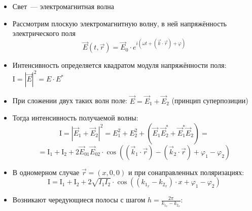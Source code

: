 \documentclass[a4paper, 12pt]{extarticle}
\newcommand{\vect}[1]{\vec{#1}} %
\newcommand{\conj}[1]{#1^*} %
\renewcommand{\phi}{\varphi} %
\newcommand{\I}{\mathrm{I}} %
\begin{document}
  \begin{itemize}
    \item Свет~--- электромагнитная волна
    \item Рассмотрим плоскую электромагнитную волну, в ней напряжённость электрического поля
      \[
        \vect{E}(t, \vect{r}) = \vect{E}_0 \cdot e^{i(\omega t + (\vect{k}\cdot\vect{r}) + \phi)}
      \]
    \item Интенсивность определяется квадратом модуля напряжённости поля: $\I = |\vect{E}|^2 = E\cdot\conj{E}$
    \item При сложении двух таких волн поле: $\vect{E} = \vect{E}_1 + \vect{E}_2$ (принцип суперпозиции)
    \item Тогда интенсивность получаемой волны:
      \[
        \I = |\vect{E}_1 + \vect{E}_2|^2 = E_1^2 + E_2^2 + (\vect{E}_1\conj{\vect{E}_2} + \conj{\vect{E}_1}\vect{E}_2) =
      \]\[
        = \I_1 + \I_2 + 2 \vect{E}_{01} \vect{E}_{02} \cdot \cos \left( (\vect{k}_1\cdot\vect{r}) -
          (\vect{k}_2\cdot\vect{r}) + \phi_1 - \phi_2 \right)
      \]
    \item В одномерном случае $\vect{r} = (x, 0, 0)$ и при сонаправленных поляризациях:
      \[
        \I = \I_1 + \I_2 + 2 \sqrt{I_1 I_2} \cdot \cos \left(
          (k_{1_x} - k_{2_x}) \cdot x
        + \phi_1 - \phi_2 \right)
      \]
    \item Возникают чередующиеся полосы с шагом $h=\frac{2\pi}{k_{1_x}-k_{2_x}}$:
      \begin{center}
      \end{center}
  \end{itemize}
\end{document}
